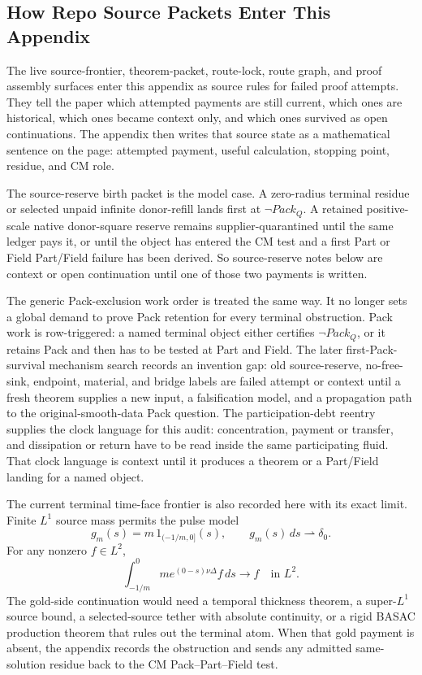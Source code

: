 \subsection{How Repo Source Packets Enter This Appendix}

The live source-frontier, theorem-packet, route-lock, route graph, and proof
assembly surfaces enter this appendix as source rules for failed proof
attempts.  They tell the paper which attempted payments are still current,
which ones are historical, which ones became context only, and which ones
survived as open continuations.  The appendix then writes that source state as a
mathematical sentence on the page: attempted payment, useful calculation,
stopping point, residue, and CM role.

The source-reserve birth packet is the model case.  A zero-radius terminal
residue or selected unpaid infinite donor-refill lands first at
\(\neg Pack_Q\).  A retained positive-scale native donor-square reserve remains
supplier-quarantined until the same ledger pays it, or until the object has
entered the CM test and a first Part or Field Part/Field failure has been
derived.  So source-reserve notes below are context or open continuation until
one of those two payments is written.

The generic Pack-exclusion work order is treated the same way.  It no longer
sets a global demand to prove Pack retention for every terminal obstruction.
Pack work is row-triggered: a named terminal object either certifies
\(\neg Pack_Q\), or it retains Pack and then has to be tested at Part and Field.
The later first-Pack-survival mechanism search records an invention gap: old
source-reserve, no-free-sink, endpoint, material, and bridge labels are failed
attempt or context until a fresh theorem supplies a new input, a falsification
model, and a propagation path to the original-smooth-data Pack question.
The participation-debt reentry supplies the clock language for this audit:
concentration, payment or transfer, and dissipation or return have to be read
inside the same participating fluid.  That clock language is context until it
produces a theorem or a Part/Field landing for a named object.

The current terminal time-face frontier is also recorded here with its exact
limit.  Finite \(L^1\) source mass permits the pulse model
\[
  g_m(s)=m\,1_{(-1/m,0]}(s),
  \qquad g_m(s)\,ds\rightharpoonup\delta_0 .
\]
For any nonzero \(f\in L^2\),
\[
  \int_{-1/m}^0 m e^{(0-s)\nu\Delta}f\,ds\to f
  \quad\text{in }L^2 .
\]
The gold-side continuation would need a temporal thickness theorem, a
super-\(L^1\) source bound, a selected-source tether with absolute continuity,
or a rigid BASAC production theorem that rules out the terminal atom.  When that
gold payment is absent, the appendix records the obstruction and sends any
admitted same-solution residue back to the CM Pack--Part--Field test.

